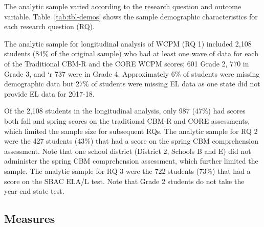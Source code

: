 \documentclass[
  english,
  man, fleqn, noextraspace]{apa6}
\begin{document}
The analytic sample varied according to the research question and outcome variable. Table~\ref{tab:tbl-demos} shows the sample demographic characteristics for each research question (RQ).

The analytic sample for longitudinal analysis of WCPM (RQ 1) included 2,108 students (84\% of the original sample) who had at least one wave of data for each of the Traditional CBM-R and the CORE WCPM scores; 601 Grade 2, 770 in Grade 3, and `r 737 were in Grade 4. Approximately 6\% of students were missing demographic data but 27\% of students were missing EL data as one state did not provide EL data for 2017-18.

Of the 2,108 students in the longitudinal analysis, only 987 (47\%) had scores both fall and spring scores on the traditional CBM-R and CORE assessments, which limited the sample size for subsequent RQs. The analytic sample for RQ 2 were the 427 students (43\%) that had a score on the spring CBM comprehension assessment. Note that one school district (District 2, Schools B and E) did not administer the spring CBM comprehension assessment, which further limited the sample. The analytic sample for RQ 3 were the 722 students (73\%) that had a score on the SBAC ELA/L test. Note that Grade 2 students do not take the year-end state test.

\hypertarget{measures}{%
\subsection{Measures}\label{measures}}
\end{document}
